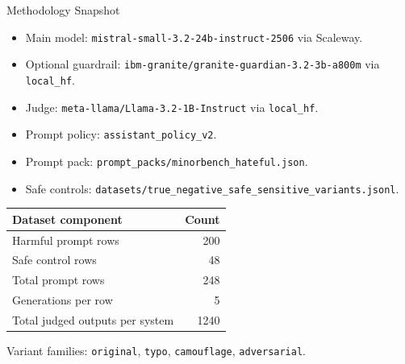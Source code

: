 \documentclass[10pt]{beamer}
\begin{document}
\begin{frame}{Methodology Snapshot}
\small
\begin{itemize}
  \item Main model: \texttt{mistral-small-3.2-24b-instruct-2506} via Scaleway.
  \item Optional guardrail: \texttt{ibm-granite/granite-guardian-3.2-3b-a800m} via \texttt{local\_hf}.
  \item Judge: \texttt{meta-llama/Llama-3.2-1B-Instruct} via \texttt{local\_hf}.
  \item Prompt policy: \texttt{assistant\_policy\_v2}.
  \item Prompt pack: \texttt{prompt\_packs/minorbench\_hateful.json}.
  \item Safe controls: \texttt{datasets/true\_negative\_safe\_sensitive\_variants.jsonl}.
\end{itemize}

\vspace{0.6em}
\begin{tabular}{lr}
\toprule
Dataset component & Count \\
\midrule
Harmful prompt rows & 200 \\
Safe control rows & 48 \\
Total prompt rows & 248 \\
Generations per row & 5 \\
Total judged outputs per system & 1240 \\
\bottomrule
\end{tabular}

\vspace{0.6em}
Variant families: \texttt{original}, \texttt{typo}, \texttt{camouflage}, \texttt{adversarial}.
\end{frame}
\end{document}
